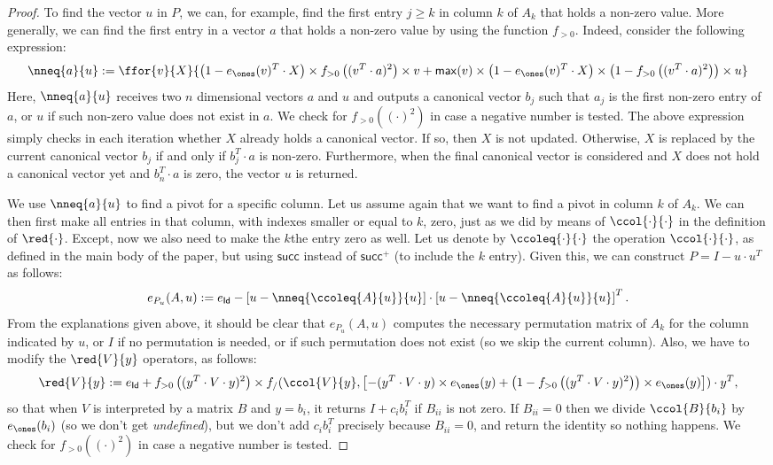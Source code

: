\begin{proof}
To find the vector $u$ in $P$, we can, for example, find the first entry $j\geq k$ in column $k$ of $A_k$ that holds a non-zero value. More generally, we can find the first entry in a vector $a$ that holds a non-zero value by using the function $f_{>0}$. Indeed, consider the following expression:
$$
\nneq{a}{u}:=\ffor{v}{X}{\left( 1-e_{\ones}(v)^T\cdot X \right) \times f_{>0}\left( ( v^T\cdot a )^2 \right)\times v + \mathsf{max}(v)\times\left( 1-e_{\ones}(v)^T\cdot X \right)\times \left( 1 - f_{>0}\left( ( v^T\cdot a )^2 \right) \right) \times u}
$$
Here, $\nneq{a}{u}$ receives two $n$ dimensional vectors $a$ and $u$ and outputs a 
canonical vector $b_j$ such that $a_j$ is the first non-zero entry of $a$, or $u$ if such non-zero value does not exist in $a$. We check for $f_{>0}((\cdot)^2)$ 
in case a negative number is tested. The above expression simply checks in each iteration
whether $X$ already holds a canonical vector. If so, then $X$ is not updated. Otherwise,
$X$ is replaced by the current canonical vector $b_j$ if and only if $b_j^T\cdot a$ is non-zero. Furthermore, when the final canonical vector is considered and $X$ does not hold
a canonical vector yet and $b_n^T\cdot a$ is zero, the vector $u$ is returned.

We use $\nneq{a}{u}$ to find a pivot for a specific column. Let us assume again that we
want to find a pivot in column $k$ of $A_k$. We can then first make all entries in that column, with indexes smaller or equal to $k$, zero, just as we did by means of $\ccol{\cdot}{\cdot}$ in the
definition of $\red{\cdot}$. Except, now we also need to make the $k$the entry zero as well.
Let us denote by $\ccoleq{\cdot}{\cdot}$ the operation $\ccol{\cdot}{\cdot}$, as defined in the main body of the paper, but using $\mathsf{succ}$ instead of $\mathsf{succ}^+$ (to include the $k$ entry). Given this, we can construct $P=I-u\cdot u^T$ as follows:
$$
e_{P_u}(A,u) := e_{\mathsf{Id}} - \left[ u - \nneq{ \ccoleq{A}{u} }{u} \right]\cdot \left[ u - \nneq{ \ccoleq{A}{u} }{u} \right]^T.
$$ 
From the explanations given above, it should be clear that $e_{P_u}(A,u)$ computes the necessary permutation matrix of $A_k$ for the column indicated by $u$, or $I$
if no permutation is needed, or if such permutation does not exist (so we skip the current column). Also, we have to modify the $\red{V}{y}$ operators, as follows:
$$
\red{V}{y}:= e_{\mathsf{Id}}+ f_{>0}\left( ( y^T\cdot V\cdot y)^2 \right)\times f_/(\ccol{V}{y},\left[ -(y^T\cdot V\cdot y)\times e_{\ones}(y) + \left( 1 - f_{>0}\left( ( y^T\cdot V\cdot y)^2 \right) \right)\times e_{\ones}(y) \right])\cdot y^T,
$$
so that when $V$ is interpreted by a matrix $B$ and $y=b_i$, it returns $I+c_ib_i^T$ if $B_{ii}$ is not zero. 
If $B_{ii}=0$ then we divide $\ccol{B}{b_i}$ by $e_{\ones}(b_i)$ (so we don't get \textit{undefined}), 
but we don't add $c_ib_i^T$ precisely because $B_{ii}=0$, and return the identity so nothing happens. We check 
for $f_{>0}((\cdot)^2)$ in case a negative number is tested.


\end{proof}
